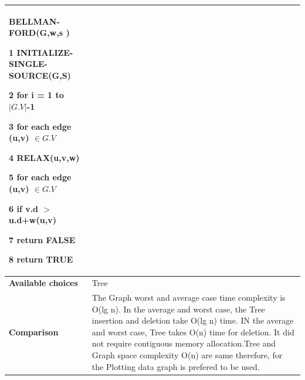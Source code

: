 \documentclass[12pt,a4paper]{article}
\begin{document}
\begin{longtable}{| p{3cm}|p{12cm}|}
BELLMAN-FORD(G,w,s )

1 INITIALIZE-SINGLE-SOURCE(G,S)

2 for i = 1 to $|G.V|$-1

3\hspace{6 mm} for each edge (u,v) $\in G.V$

4\hspace{12 mm} RELAX(u,v,w)

5 for each edge (u,v) $\in G.V$

6\hspace{6 mm} if v.d $>$ u.d+w(u,v)

7\hspace{12 mm} return FALSE

8 return TRUE

 \\ \hline
\textbf{Available choices}& Tree \\ \hline
\textbf{Comparison}&
The Graph worst and average case time complexity is O(lg n). In the average and worst case, the Tree insertion and deletion take O(lg n) time. IN the average and worst case, Tree takes O(n) time for deletion. It did not require contiguous memory allocation.Tree and Graph space complexity O(n) are  same therefore, for the Plotting  data graph is prefered to be used.
 \\ \hline
 \end{longtable}
\end{document}
